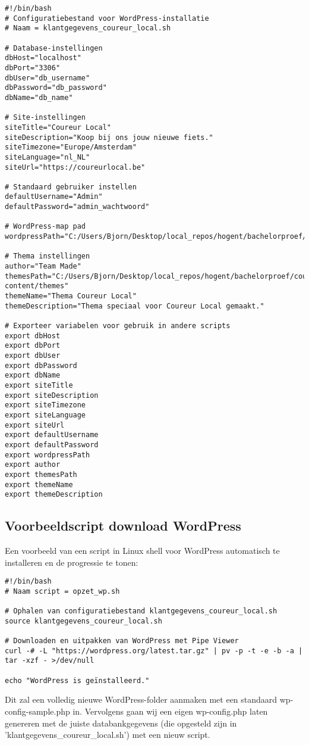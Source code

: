 \begin{verbatim}
#!/bin/bash
# Configuratiebestand voor WordPress-installatie
# Naam = klantgegevens_coureur_local.sh

# Database-instellingen
dbHost="localhost"
dbPort="3306"
dbUser="db_username"
dbPassword="db_password"
dbName="db_name"

# Site-instellingen
siteTitle="Coureur Local"
siteDescription="Koop bij ons jouw nieuwe fiets."
siteTimezone="Europe/Amsterdam"
siteLanguage="nl_NL"
siteUrl="https://coureurlocal.be"

# Standaard gebruiker instellen
defaultUsername="Admin"
defaultPassword="admin_wachtwoord"

# WordPress-map pad
wordpressPath="C:/Users/Bjorn/Desktop/local_repos/hogent/bachelorproef/coureur_local/wordpress"

# Thema instellingen
author="Team Made"
themesPath="C:/Users/Bjorn/Desktop/local_repos/hogent/bachelorproef/coureur_local/wordpress/wp-content/themes"
themeName="Thema Coureur Local"
themeDescription="Thema speciaal voor Coureur Local gemaakt."

# Exporteer variabelen voor gebruik in andere scripts
export dbHost
export dbPort
export dbUser
export dbPassword
export dbName
export siteTitle
export siteDescription
export siteTimezone
export siteLanguage
export siteUrl
export defaultUsername
export defaultPassword
export wordpressPath
export author
export themesPath
export themeName
export themeDescription
\end{verbatim}

\subsection{Voorbeeldscript download WordPress}
Een voorbeeld van een script in Linux shell voor WordPress automatisch te installeren en de progressie te tonen:
\begin{verbatim}
#!/bin/bash
# Naam script = opzet_wp.sh

# Ophalen van configuratiebestand klantgegevens_coureur_local.sh
source klantgegevens_coureur_local.sh

# Downloaden en uitpakken van WordPress met Pipe Viewer
curl -# -L "https://wordpress.org/latest.tar.gz" | pv -p -t -e -b -a | tar -xzf - >/dev/null

echo "WordPress is geïnstalleerd."
\end{verbatim}
Dit zal een volledig nieuwe WordPress-folder aanmaken met een standaard wp-config-sample.php in. Vervolgens gaan wij een eigen wp-config.php laten genereren met de juiste databankgegevens (die opgesteld zijn in 'klantgegevens\_coureur\_local.sh') met een nieuw script.

